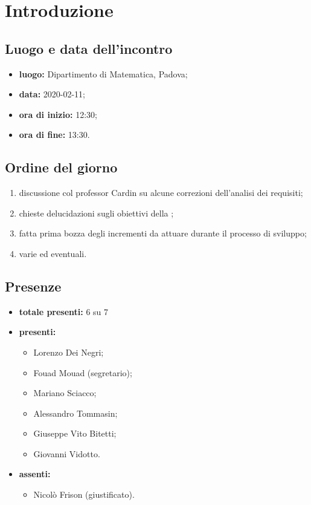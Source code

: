 \section*{Introduzione}

\subsection*{Luogo e data dell'incontro}
	\begin{itemize}
		\item \textbf{luogo:} Dipartimento di Matematica, Padova;
		\item \textbf{data:} 2020-02-11;
		\item \textbf{ora di inizio:} 12:30;
		\item \textbf{ora di fine:} 13:30.
	\end{itemize}

\subsection*{Ordine del giorno}
	\begin{enumerate}
			\item discussione col professor Cardin su alcune correzioni dell'analisi dei requisiti;
  			\item chieste delucidazioni sugli obiettivi della ;
  			\item fatta prima bozza degli incrementi da attuare durante il processo di sviluppo;
  			\item varie ed eventuali.
	\end{enumerate}

\subsection*{Presenze}
	\begin{itemize}
		\item \textbf{totale presenti:} 6 su 7
		\item \textbf{presenti: }
			\begin{itemize}
				\item Lorenzo Dei Negri;
				\item Fouad Mouad (segretario);
				\item Mariano Sciacco;
				\item Alessandro Tommasin;
				\item Giuseppe Vito Bitetti;
				\item Giovanni Vidotto.
			\end{itemize}
		\item \textbf{assenti: }
			\begin{itemize}
				\item Nicolò Frison (giustificato).
			\end{itemize}
	\end{itemize}


